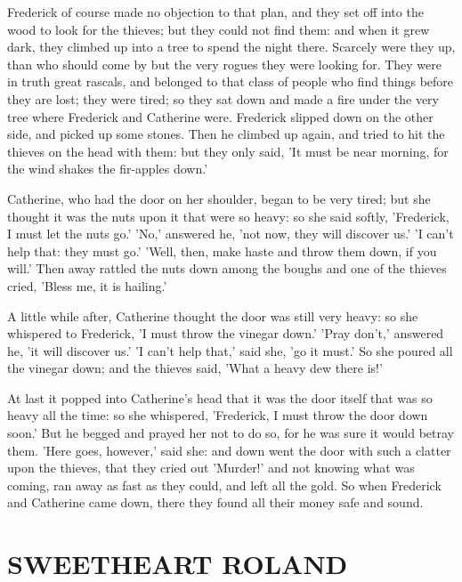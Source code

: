\documentclass[12pt]{book}
\begin{document}
Frederick of course made no objection to that plan, and they set off
into the wood to look for the thieves; but they could not find them:
and when it grew dark, they climbed up into a tree to spend the night
there. Scarcely were they up, than who should come by but the very
rogues they were looking for. They were in truth great rascals, and
belonged to that class of people who find things before they are lost;
they were tired; so they sat down and made a fire under the very tree
where Frederick and Catherine were. Frederick slipped down on the
other side, and picked up some stones. Then he climbed up again, and
tried to hit the thieves on the head with them: but they only said,
'It must be near morning, for the wind shakes the fir-apples down.'

Catherine, who had the door on her shoulder, began to be very tired;
but she thought it was the nuts upon it that were so heavy: so she
said softly, 'Frederick, I must let the nuts go.' 'No,' answered he,
'not now, they will discover us.' 'I can't help that: they must go.'
'Well, then, make haste and throw them down, if you will.' Then away
rattled the nuts down among the boughs and one of the thieves cried,
'Bless me, it is hailing.'

A little while after, Catherine thought the door was still very heavy:
so she whispered to Frederick, 'I must throw the vinegar down.' 'Pray
don't,' answered he, 'it will discover us.' 'I can't help that,' said
she, 'go it must.' So she poured all the vinegar down; and the thieves
said, 'What a heavy dew there is!'

At last it popped into Catherine's head that it was the door itself
that was so heavy all the time: so she whispered, 'Frederick, I must
throw the door down soon.' But he begged and prayed her not to do so,
for he was sure it would betray them. 'Here goes, however,' said she:
and down went the door with such a clatter upon the thieves, that they
cried out 'Murder!' and not knowing what was coming, ran away as fast
as they could, and left all the gold. So when Frederick and Catherine
came down, there they found all their money safe and sound.



\chapter{SWEETHEART ROLAND}
\end{document}
